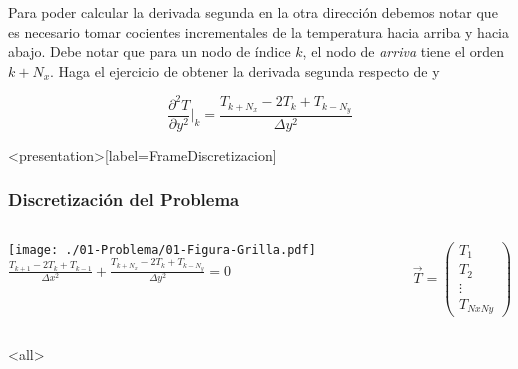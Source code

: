 
Para poder calcular la derivada segunda en la otra dirección 
debemos notar que es necesario tomar cocientes incrementales
de la temperatura hacia arriba y hacia abajo. Debe notar que 
para un nodo de índice $k$, el nodo de \emph{arriva} tiene 
el orden $k+N_x$. Haga el ejercicio de obtener la derivada 
segunda respecto de y

\begin{equation}\label{EqEcuacionDerivadaY}
    \frac{\partial^2 T}{\partial y^2} \Bigr\rvert _k 
    =
    \frac{T_{k+N_x} - 2T_k +T_{k-N_y} }{\Delta y ^2}
\end{equation}



\mode*

\begin{frame}<presentation>[label=FrameDiscretizacion]
  \frametitle{Discretización del Problema}
  \begin{columns}
    \texttt{[image: ./01-Problema/01-Figura-Grilla.pdf]}
%    
\centering
$\frac{T_{k+1} - 2T_k +T_{k-1} }
  {\Delta x ^2} +
 \frac{ T_{k+N_x} - 2T_k +T_{k-N_y} }{ \Delta y^2 } =0 $

    \vspace{1cm}
    $ \vec{T}= \begin{pmatrix}
    T_1 \\ T_2 \\ \vdots \\ T_{Nx Ny}
     \end{pmatrix}$ 

  \end{columns}
\end{frame}

\mode<all>
